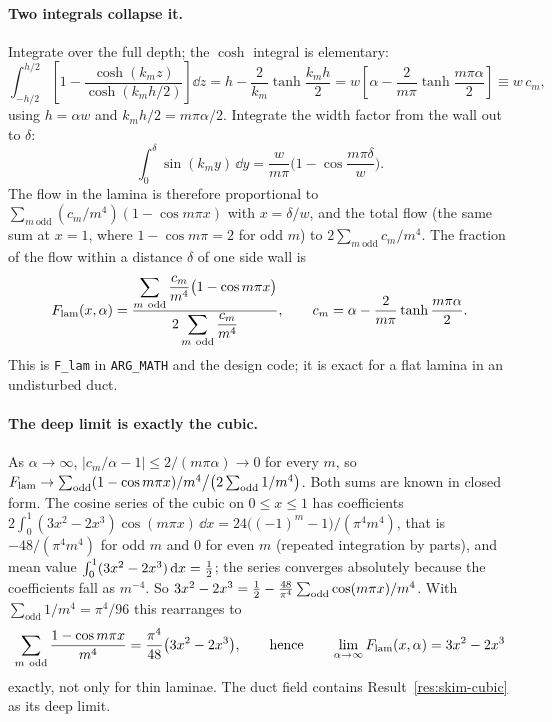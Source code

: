 \paragraph{Two integrals collapse it.} Integrate over the full depth; the $\cosh$ integral is
elementary:
\begin{equation}
\int_{-h/2}^{h/2}\left[1 - \frac{\cosh(k_m z)}{\cosh(k_m h/2)}\right]\dd z = h - \frac{2}{k_m}\tanh\frac{k_m h}{2}
= w\left[\alpha-\frac{2}{m\pi}\tanh\frac{m\pi\alpha}{2}\right]\equiv w\,c_m,
\label{eq:cm}
\end{equation}
using $h=\alpha w$ and $k_mh/2=m\pi\alpha/2$. Integrate the width factor from the wall out to
$\delta$:
\begin{equation}
\int_0^{\delta}\sin(k_m y)\,\dd y = \frac{w}{m\pi}\Big(1 - \cos\frac{m\pi\delta}{w}\Big).
\end{equation}
The flow in the lamina is therefore proportional to
$\sum_{m\ \text{odd}}(c_m/m^4)(1-\cos m\pi x)$ with $x=\delta/w$, and the total flow (the
same sum at $x=1$, where $1-\cos m\pi=2$ for odd $m$) to $2\sum_{m\ \text{odd}} c_m/m^4$. The
fraction of the flow within a distance $\delta$ of one side wall is
\begin{equation}
F_{\mathrm{lam}}(x,\alpha) = \frac{\displaystyle\sum_{m\ \text{odd}} \frac{c_m}{m^4}\big(1 - \cos m\pi x\big)}{\displaystyle 2\sum_{m\ \text{odd}} \frac{c_m}{m^4}},
\qquad c_m=\alpha-\frac{2}{m\pi}\tanh\frac{m\pi\alpha}{2}.
\label{eq:ductseries}
\end{equation}
This is \texttt{F\_lam} in \texttt{ARG\_MATH} and the design code; it is exact for a flat
lamina in an undisturbed duct.

\paragraph{The deep limit is exactly the cubic.} As $\alpha\to\infty$,
$|c_m/\alpha-1|\le 2/(m\pi\alpha)\to0$ for every $m$, so
$F_{\mathrm{lam}}\to\sum_{\text{odd}}(1-\cos m\pi x)/m^4\big/\big(2\sum_{\text{odd}}1/m^4\big)$. Both sums are
known in closed form. The cosine series of the cubic on $0\le x\le1$ has coefficients
$2\int_0^1(3x^2-2x^3)\cos(m\pi x)\,\dd x=24\big((-1)^m-1\big)/(\pi^4m^4)$, that is
$-48/(\pi^4m^4)$ for odd $m$ and $0$ for even $m$ (repeated integration by parts), and mean value
$\int_0^1(3x^2-2x^3)\,\mathrm{d} x=\tfrac{1}{2}$; the series converges absolutely because the coefficients fall as $m^{-4}$. So
$3x^2-2x^3=\tfrac{1}{2}-\frac{48}{\pi^4}\sum_{\text{odd}}\cos(m\pi x)/m^4$. With
$\sum_{\text{odd}}1/m^4=\pi^4/96$ this rearranges to
\begin{equation}
\sum_{m\ \text{odd}}\frac{1-\cos m\pi x}{m^4}=\frac{\pi^4}{48}\big(3x^2-2x^3\big),
\qquad\text{hence}\qquad \lim_{\alpha\to\infty}\Flam(x,\alpha)=3x^2-2x^3
\end{equation}
exactly, not only for thin laminae. The duct field contains Result~\ref{res:skim-cubic} as its
deep limit.

